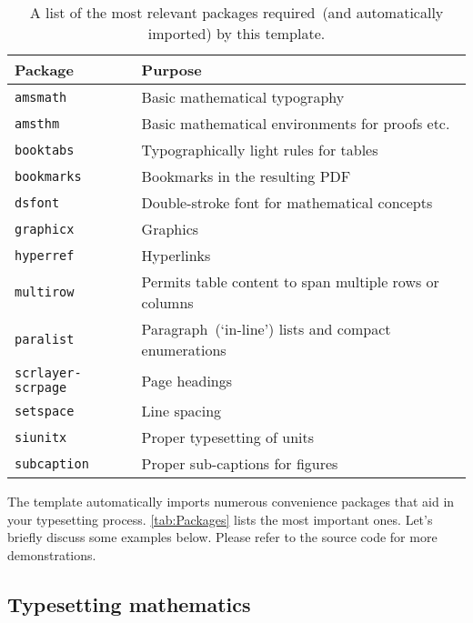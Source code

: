 \begin{table}
  \centering
  \begin{tabular}{ll}
    \toprule
    \textbf{Package}      & \textbf{Purpose}\\
    \midrule
      \texttt{amsmath}          & Basic mathematical typography\\
      \texttt{amsthm}           & Basic mathematical environments for proofs etc.\\
      \texttt{booktabs}         & Typographically light rules for tables\\
      \texttt{bookmarks}        & Bookmarks in the resulting PDF\\
      \texttt{dsfont}           & Double-stroke font for mathematical concepts\\
      \texttt{graphicx}         & Graphics\\
      \texttt{hyperref}         & Hyperlinks\\
      \texttt{multirow}         & Permits table content to span multiple rows or columns\\
      \texttt{paralist}         & Paragraph~(`in-line') lists and compact enumerations\\
      \texttt{scrlayer-scrpage} & Page headings\\
      \texttt{setspace}         & Line spacing\\
      \texttt{siunitx}          & Proper typesetting of units\\
      \texttt{subcaption} & Proper sub-captions for figures\\
    \bottomrule
  \end{tabular}
  \caption{%
    A list of the most relevant packages required~(and automatically imported) by this template.
  }
  \label{tab:Packages}
\end{table}

The template automatically imports numerous convenience packages that
aid in your typesetting process. \autoref{tab:Packages} lists the
most important ones. Let's briefly discuss some examples below. Please
refer to the source code for more demonstrations.

\subsection{Typesetting mathematics}

